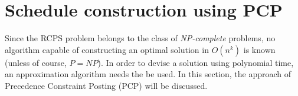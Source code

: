 \documentclass{article}
\newcommand{\TODO}[1]{{\color{red}\textbf{TODO: #1}}}
\newcommand{\dur}[1]{\textit{Dur}(#1)} %
\begin{document}
\begin{comment}
\TODO{Dit moest er toch uit?}
\subsection{Problem Extension}
The basic RCPS problem will sometimes not suffice. Several extensions to the RCPS problem have been made to better suit real-life environments. The following paragraphs will provide a brief overview of how the problem can be augmented. Although it is not in the scope of this paper to address the extensions in detail, some context is provided to show in which areas the model can be expanded.

\subsubsection{Multi-mode project scheduling}
In multi-mode RCPS, activities can be executed in multiple modes. The activity modes are characterized by a certain resource requirement and a duration. For instance, one can either build a wall with one worker in three days or with two workers in two days. Instead of letting $\dur{v_i}$ be the duration of an activity $v_i$, the duration is dependent on the mode in in which the activity is executed. The notation therefore becomes $\textit{Dur}(v_i, m)$ and $\textit{Av}(v_i, m)$ in which $m$ is the mode in which the activity is executed. See \cite{herroelen05} for details. The approach to scheduling that is discussed in this paper does not account for multi-mode activities.

\subsubsection{Stochastic processing times}
Oftentimes it will be hard to estimate processing times for activities in practice and there is a big chance that the actual processing time will be different from the fixed estimate that was used in the model. Instead of using deterministic values for the activity duration, one could introduce a stochastic variable which has a certain probability distribution. In \cite{brucker99}, it is argued that stochastic processing times for project scheduling are an important step closer towards the real-life scenario. In this paper, we will focus on fixed activity durations.
\end{comment}

\newpage

\section{Schedule construction using PCP}
\label{section:PCP}
Since the RCPS problem belongs to the class of \emph{NP-complete} problems, no algorithm capable of constructing an optimal solution in $O(n^k)$ is known (unless of course, $P=NP$). In order to devise a solution using polynomial time, an approximation algorithm needs the be used. In this section, the approach of Precedence Constraint Posting (PCP) will be discussed.
\end{document}
